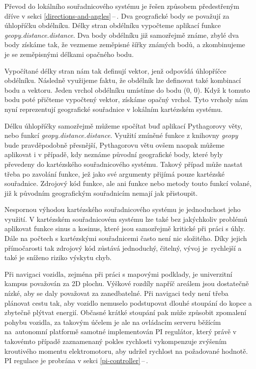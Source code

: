 \documentclass[czech, bachelor]{diploma}
\newcommand{\peteref}[1]{\ref{#1}\,--\,\nameref{#1}}
\begin{document}
Převod do lokálního souřadnicového systému je řešen způsobem předestřeným dříve v sekci \peteref{directions-and-angles}. Dva
geografické body se považují za úhlopříčku obdélníku. Délky stran obdélníku vypočteme aplikací funkce
\emph{geopy.distance.distance}. Dva body obdélníku již samozřejmě známe, zbylé dva body získáme tak, že vezmeme zeměpisné šířky
známých bodů, a zkombinujeme je se zeměpisnými délkami opačného bodu.

Vypočítané délky stran nám tak definují vektor, jenž odpovídá úhlopříčce obdélníku. Následně využijeme faktu, že obdélník lze
definovat také kombinací bodu a vektoru. Jeden vrchol obdélníku umístíme do bodu (0, 0). Když k tomuto bodu poté přičteme
vypočtený vektor, získáme opačný vrchol. Tyto vrcholy nám nyní reprezentují geografické souřadnice v lokálním kartézském systému.

Délku úhlopříčky samozřejmě můžeme spočítat buď aplikací Pythagorovy věty, nebo funkcí \emph{geopy.distance.distance}. Využití
zmíněné funkce z knihovny \emph{geopy} bude pravděpodobně přesnější, Pythagorovu větu ovšem naopak můžeme aplikovat i v případě,
kdy neznáme původní geografické body, které byly převedeny do kartézského souřadnicového systému. Takový případ může nastat třeba
po zavolání funkce, jež jako své argumenty přijímá pouze kartézské souřadnice. Zdrojový kód funkce, ale ani funkce nebo metody
touto funkcí volané, již k původním geografickým souřadnicím nemají jak přistoupit.

Nespornou výhodou kartézského souřadnicového systému je jednoduchost jeho využití. V kartézském souřadnicovém systému lze také
bez jakýchkoliv problémů aplikovat funkce sinus a kosinus, které jsou samozřejmě kritické při práci s úhly. Dále na počtech
s kartézskými souřadnicemi často není nic složitého. Díky jejich přímočarosti tak zdrojový kód zůstává jednoduchý, čitelný,
vývoj je~rychlejší a také je sníženo riziko výskytu chyb.

Při navigaci vozidla, zejména při práci s mapovými podklady, je univerzitní kampus považován za 2D plochu. Výškové rozdíly napříč
areálem jsou dostatečně nízké, aby se daly považovat za zanedbatelné. Při navigaci tedy není třeba plánovat cestu tak, aby vozidlo
nemuselo podstupovat dlouhé stoupání do kopce a zbytečně plýtvat energií. Občasné krátké stoupání pak může způsobit zpomalení
pohybu vozidla, za takovým účelem je ale na ovládacím serveru běžícím na~autonomní platformě samotné implementován PI regulátor,
který právě v takovémto případě zaznamenaný pokles rychlosti vykompenzuje zvýšením kroutivého momentu elektromotoru, aby udržel
rychlost na požadované hodnotě. PI regulace je probrána v sekci \peteref{pi-controller}.
\end{document}
